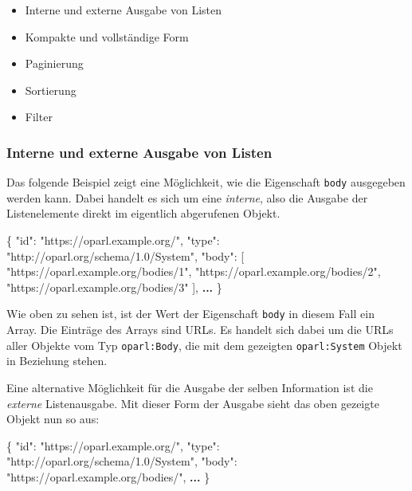 \documentclass[,a4paper]{article}
\newenvironment{Shaded}{}{}
\newcommand{\DataTypeTok}[1]{\textcolor[rgb]{0.56,0.13,0.00}{{#1}}}
\newcommand{\StringTok}[1]{\textcolor[rgb]{0.25,0.44,0.63}{{#1}}}
\newcommand{\OtherTok}[1]{\textcolor[rgb]{0.00,0.44,0.13}{{#1}}}
\newcommand{\FunctionTok}[1]{\textcolor[rgb]{0.02,0.16,0.49}{{#1}}}
\newcommand{\ErrorTok}[1]{\textcolor[rgb]{1.00,0.00,0.00}{\textbf{{#1}}}}
\begin{document}
\begin{itemize}
\itemsep1pt\parskip0pt
\item
  Interne und externe Ausgabe von Listen
\item
  Kompakte und vollständige Form
\item
  Paginierung
\item
  Sortierung
\item
  Filter
\end{itemize}

\subsubsection{Interne und externe Ausgabe von
Listen}\label{objektlistenux5finternextern}

Das folgende Beispiel zeigt eine Möglichkeit, wie die Eigenschaft
\texttt{body} ausgegeben werden kann. Dabei handelt es sich um eine
\emph{interne}, also die Ausgabe der Listenelemente direkt im eigentlich
abgerufenen Objekt.

\begin{Shaded}
\begin{Highlighting}[]
\FunctionTok{\{}
    \DataTypeTok{"id"}\FunctionTok{:} \StringTok{"https://oparl.example.org/"}\FunctionTok{,}
    \DataTypeTok{"type"}\FunctionTok{:} \StringTok{"http://oparl.org/schema/1.0/System"}\FunctionTok{,}
    \DataTypeTok{"body"}\FunctionTok{:} \OtherTok{[}
        \StringTok{"https://oparl.example.org/bodies/1"}\OtherTok{,}
        \StringTok{"https://oparl.example.org/bodies/2"}\OtherTok{,}
        \StringTok{"https://oparl.example.org/bodies/3"}
    \OtherTok{]}\FunctionTok{,}
    \ErrorTok{...}
\FunctionTok{\}}
\end{Highlighting}
\end{Shaded}

Wie oben zu sehen ist, ist der Wert der Eigenschaft \texttt{body} in
diesem Fall ein Array. Die Einträge des Arrays sind URLs. Es handelt
sich dabei um die URLs aller Objekte vom Typ \texttt{oparl:Body}, die
mit dem gezeigten \texttt{oparl:System} Objekt in Beziehung stehen.

Eine alternative Möglichkeit für die Ausgabe der selben Information ist
die \emph{externe} Listenausgabe. Mit dieser Form der Ausgabe sieht das
oben gezeigte Objekt nun so aus:

\begin{Shaded}
\begin{Highlighting}[]
\FunctionTok{\{}
    \DataTypeTok{"id"}\FunctionTok{:} \StringTok{"https://oparl.example.org/"}\FunctionTok{,}
    \DataTypeTok{"type"}\FunctionTok{:} \StringTok{"http://oparl.org/schema/1.0/System"}\FunctionTok{,}
    \DataTypeTok{"body"}\FunctionTok{:} \StringTok{"https://oparl.example.org/bodies/"}\FunctionTok{,}
    \ErrorTok{...}
\FunctionTok{\}}
\end{Highlighting}
\end{Shaded}
\end{document}
